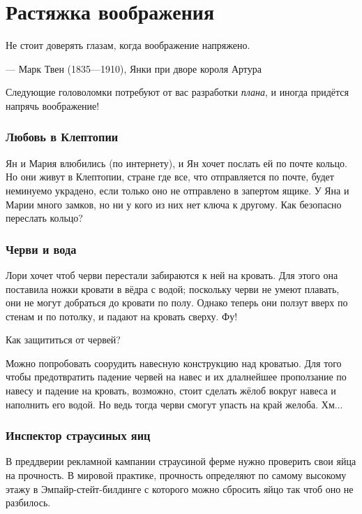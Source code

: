 \chapter{Растяжка воображения}


\setlength{\epigraphwidth}{.80\textwidth}
\epigraph{Не стоит доверять глазам, когда воображение напряжено.
}{--- Марк Твен (1835---1910), Янки при дворе короля Артура}

Следующие головоломки потребуют от вас разработки \emph{плана},
и иногда придётся напрячь воображение!

\subsection*{Любовь в Клептопии}

Ян и Мария влюбились (по интернету), и Ян хочет послать ей по почте кольцо.
Но они живут в Клептопии, стране где все, что отправляется по почте, будет неминуемо украдено, если только оно не отправлено в запертом ящике.
У Яна и Марии много замков, но ни у кого из них нет ключа к другому.
Как безопасно переслать кольцо?

\subsection*{Черви и вода}

Лори хочет чтоб черви перестали забираются к ней на кровать.
Для этого она поставила ножки кровати в вёдра с водой;
поскольку черви не умеют плавать, они не могут добраться до кровати по полу.
Однако теперь они ползут вверх по стенам и по потолку, и падают на кровать сверху.
Фу!

Как защититься от червей?

Можно попробовать соорудить навесную конструкцию над кроватью.
Для того чтобы предотвратить падение червей на навес и их длалнейшее проползание по навесу и падение на кровать, возможно, стоит сделать жёлоб вокруг навеса и наполнить его водой.
Но ведь тогда черви смогут упасть на край желоба.
Хм...

\subsection*{Инспектор страусиных яиц}

В преддверии рекламной кампании страусиной ферме нужно проверить свои яйца на прочность.
В мировой практике, прочность определяют по самому высокому этажу в Эмпайр-стейт-билдинге с которого можно сбросить яйцо так чтоб оно не разбилось.

